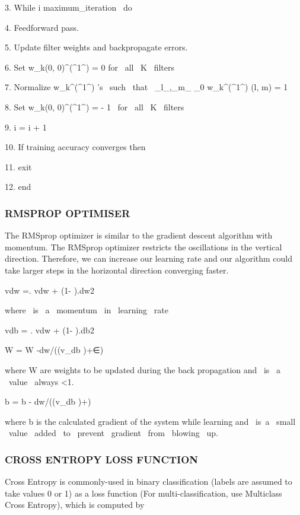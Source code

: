 3. While  i \leq  maximum\_iteration \ do

4. Feedforward  pass.

5. Update filter weights  and backpropagate errors.

6. Set w_k(0, 0)^(^1^) = 0  for \ all \ K \ filters

7. Normalize w_k^(^1^)  ’s \ such \ that \  \Sigma_l_,_m_ \neq _0 w_k^(^1^)   (l, m) = 1

8. Set w_k(0, 0)^(^1^) = - 1  \ for \ all \  K \ filters

9. i = i + 1

10. If training accuracy converges then

11. exit

12. end
\newpage
\subsubsection{RMSPROP OPTIMISER }
The RMSprop optimizer is similar to the gradient descent algorithm with momentum. The RMSprop optimizer restricts the oscillations in the vertical direction. Therefore, we can increase our learning rate and our algorithm could take larger steps in the horizontal direction converging faster. 

              vdw =\beta. vdw  + (1- \beta).dw2  
                 
                     where  \beta \ is \ a \ momentum \ in \ learning \ rate 
              
              vdb  = \beta. vdw  + (1- \beta).db2
              
              W = W -\alpha dw/(\sqrt(v\_db )+∈)      
                     
                     where W are weights to be updated during the back propagation and  \alpha \ is \ a \ value \  always \textless 1.      
               
              b = b - \alpha dw/(\sqrt(v\_db )+\epsilon)     
              
                     where b is the calculated gradient of the system while learning and \epsilon \  is\ a \ small \ value \  added \ to \ prevent \ gradient \ from \ blowing \ up.

\subsubsection{CROSS ENTROPY LOSS FUNCTION}
Cross Entropy is commonly-used in binary classification (labels are assumed to take values 0 or 1) as a loss function (For multi-classification, use Multiclass Cross Entropy), which is computed by  

